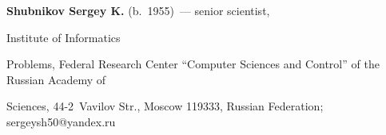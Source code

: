       


      \noindent


      \textbf{Shubnikov Sergey K.} (b.\ 1955)~--- senior scientist, 


      Institute of Informatics 


Problems, Federal Research Center ``Computer Sciences and Control'' of the Russian Academy of 


Sciences, 44-2~Vavilov Str., Moscow 119333, Russian Federation; \mbox{sergeysh50@yandex.ru}


     


     


\label{end\stat}








\renewcommand{\bibname}{\protect\rm Литература}


